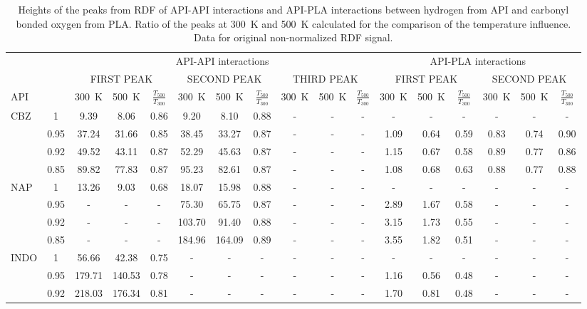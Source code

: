 	\begin{table}
	\caption{Heights of the peaks from RDF of API-API interactions and API-PLA interactions between hydrogen from API and carbonyl bonded oxygen from PLA. Ratio of the peaks at 300~K and 500~K calculated for the comparison of the temperature influence. Data for original non-normalized RDF signal.}
	\begin{tabular}{lcccccccccccccccc}
		\toprule
		\multicolumn{1}{c}{} & \multicolumn{1}{c}{} & \multicolumn{9}{c}{API-API interactions} & \multicolumn{6}{c}{API-PLA interactions} \\ 
		\multicolumn{1}{c}{} & \multicolumn{1}{c}{} & \multicolumn{3}{c}{FIRST PEAK} & \multicolumn{3}{c}{SECOND PEAK} & \multicolumn{3}{c}{THIRD PEAK} & \multicolumn{3}{c}{FIRST PEAK} & \multicolumn{3}{c}{SECOND PEAK} \\ 
		API & \boldmath{$x_{\text{API}}$} & 300~K & 500~K & $\frac{T_{500}}{T_{300}}$ & 300~K & 500~K & $\frac{T_{500}}{T_{300}}$ & 300~K & 500~K & $\frac{T_{500}}{T_{300}}$ & 300~K & 500~K & $\frac{T_{500}}{T_{300}}$ & 300~K & 500~K & $\frac{T_{500}}{T_{300}}$ \\ \toprule
		CBZ & 1 & 9.39 & 8.06 & 0.86 & 9.20 & 8.10 & 0.88 & - & - & - & - & - & - & - & - & - \\ 
		& 0.95 & 37.24 & 31.66 & 0.85 & 38.45 & 33.27 & 0.87 & - & - & - & 1.09 & 0.64 & 0.59 & 0.83 & 0.74 & 0.90 \\ 
		& 0.92 & 49.52 & 43.11 & 0.87 & 52.29 & 45.63 & 0.87 & - & - & - & 1.15 & 0.67 & 0.58 & 0.89 & 0.77 & 0.86 \\ 
		& 0.85 & 89.82 & 77.83 & 0.87 & 95.23 & 82.61 & 0.87 & - & - & - & 1.08 & 0.68 & 0.63 & 0.88 & 0.77 & 0.88 \\ \midrule
		NAP & 1 & 13.26 & 9.03 & 0.68 & 18.07 & 15.98 & 0.88 & - & - & - & - & - & - & - & - & - \\ 
		& 0.95 & - & - & - & 75.30 & 65.75 & 0.87 & - & - & - & 2.89 & 1.67 & 0.58 & - & - & - \\
		& 0.92 &-& - &- & 103.70 & 91.40 & 0.88 & - & - & - & 3.15 & 1.73 & 0.55 & - & - & - \\ 
		& 0.85 & - & - & - & 184.96 & 164.09 & 0.89 & - & - & - & 3.55 & 1.82 & 0.51 & - & - & - \\ \midrule
		INDO & 1 & 56.66 & 42.38 & 0.75 & - & - & - & - & - & - & - & - & - & - & - & - \\ 
		& 0.95 & 179.71 & 140.53 & 0.78 & - & - & - & - & - & - & 1.16 & 0.56 & 0.48 & - & - & - \\ 
		& 0.92 & 218.03 & 176.34 & 0.81 & - & - & - & - & - & - & 1.70 & 0.81 & 0.48 & - & - & - \\ 

\end{tabular}
\end{table}
